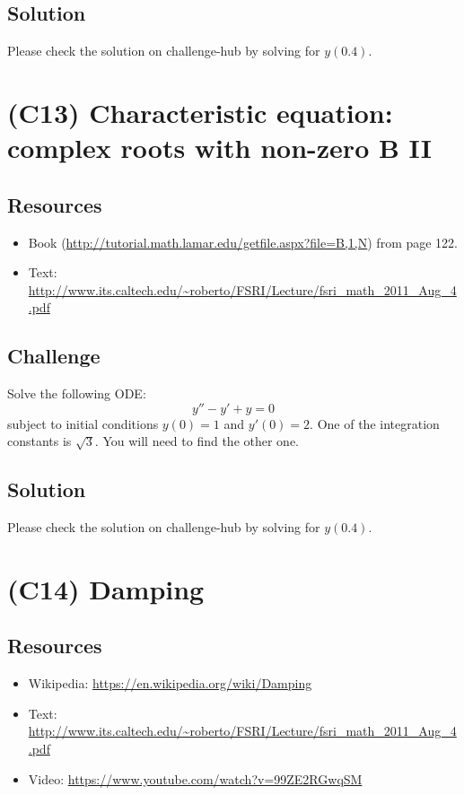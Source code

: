 \subsection*{Solution}
Please check the solution on challenge-hub by solving for $y(0.4)$.




\newpage
\section{(C13) Characteristic equation: complex roots with non-zero B II}

\subsection*{Resources}
\begin{itemize}
    \item Book (\url{http://tutorial.math.lamar.edu/getfile.aspx?file=B,1,N}) from page 122.
    \item Text: \url{http://www.its.caltech.edu/~roberto/FSRI/Lecture/fsri_math_2011_Aug_4.pdf}
\end{itemize}

\subsection*{Challenge}
Solve the following ODE:
\begin{equation}
    y'' - y' + y = 0
\end{equation}
subject to initial conditions $y(0)=1$ and $y'(0)=2$. One of the integration constants is $\sqrt{3}$. You will need to find the other one.

\subsection*{Solution}
Please check the solution on challenge-hub by solving for $y(0.4)$.




\newpage
\section{(C14) Damping}
\label{sec:damping}

\subsection*{Resources}
\begin{itemize}
    \item Wikipedia: \url{https://en.wikipedia.org/wiki/Damping}
    \item Text: \url{http://www.its.caltech.edu/~roberto/FSRI/Lecture/fsri_math_2011_Aug_4.pdf}
    \item Video: \url{https://www.youtube.com/watch?v=99ZE2RGwqSM}
\end{itemize}

